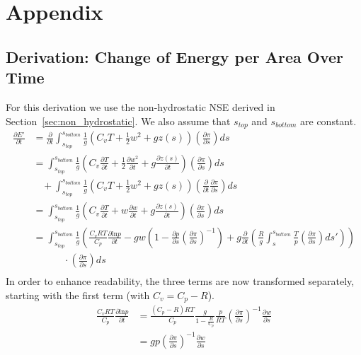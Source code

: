 \chapter{Appendix}
\section{Derivation: Change of Energy per Area Over Time}\label{sec:derivation:dE_dt}
For this derivation we use the non-hydrostatic NSE derived in Section~\ref{sec:non_hydrostatic}.
We also assume that $s_{top}$ and $s_{bottom}$ are constant.\\
\begin{align*}
\frac{\partial E'}{\partial t} &= \frac{\partial}{\partial t}\int_{s_{top}}^{s_{bottom}} \frac{1}{g}(C_vT+\frac{1}{2}w^2 + gz(s)) \left( \frac{\partial \pi}{\partial s} \right) ds\\
&= \int_{s_{top}}^{s_{bottom}} \frac{1}{g}\left(C_v\frac{\partial T}{\partial t}+\frac{1}{2}\frac{\partial w^2}{\partial t} + g\frac{\partial z(s)}{\partial t}\right) \left( \frac{\partial \pi}{\partial s} \right) ds \\&~~~~+ \int_{s_{top}}^{s_{bottom}} \frac{1}{g}(C_vT+\frac{1}{2}w^2 + gz(s)) \left( \frac{\partial}{\partial t}\frac{\partial \pi}{\partial s} \right) ds\\
&= \int_{s_{top}}^{s_{bottom}} \frac{1}{g}\left(C_v\frac{\partial T}{\partial t}+w\frac{\partial w}{\partial t} + g\frac{\partial z(s)}{\partial t}\right) \left( \frac{\partial \pi}{\partial s} \right) ds\\
&= \int_{s_{top}}^{s_{bottom}} \frac{1}{g}\left(\frac{C_vRT}{C_p}\frac{\partial \text{ln}p}{\partial t}-gw\left(1 - \frac{\partial p}{\partial s}\left(\frac{\partial \pi}{\partial s}\right)^{-1}\right) + g\frac{\partial}{\partial t}\left(\frac{R}{g}\int _s ^{s_{bottom}} \frac{T}{p}\left(\frac{\partial \pi}{\partial s}\right)ds'\right)\right) \\&~~~~~~~~~~~~~~\cdot\left( \frac{\partial \pi}{\partial s} \right) ds\\
\end{align*}
In order to enhance readability, the three terms are now transformed separately, starting with the first term (with $C_v=C_p-R$).
\begin{align*}
\frac{C_vRT}{C_p}\frac{\partial \text{ln}p}{\partial t} &= \frac{(C_p-R)RT}{C_p}\frac{g}{1- \frac{R}{C_p}} \frac{p}{RT}\left(\frac{\partial \pi}{\partial s}\right)^{-1} \frac{\partial w}{\partial s}\\
&= gp\left(\frac{\partial \pi}{\partial s}\right)^{-1} \frac{\partial w}{\partial s}
\end{align*}
